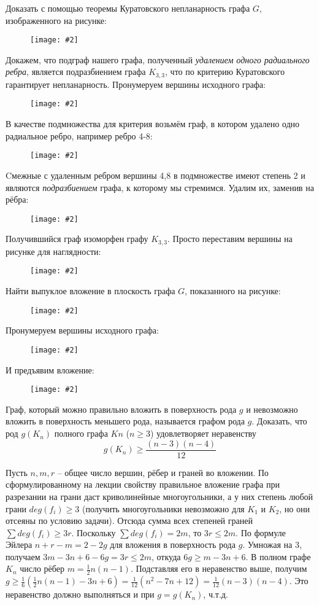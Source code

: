 \documentclass[a4paper,12pt]{article}
\numberwithin{figure}{section}
\newcommand\CenterFigure[2]{\begin{figure}[H]\centering\texttt{[image: \#2]}\end{figure}}
\begin{document}
\begin{problem}
	Доказать с помощью теоремы Куратовского непланарность графа $G$, изображенного на рисунке:
		\CenterFigure{4cm}{kuratovsky-task2-stage0-8angles.png}
\end{problem}
\begin{solution}
	Докажем, что подграф нашего графа, полученный \textit{удалением одного радиального ребра}, является подразбиением графа $K_{3,3}$, что по критерию Куратовского гарантирует непланарность.
	Пронумеруем вершины исходного графа:
		\CenterFigure{6cm}{kuratovsky-task2-stage1.png}
	В качестве подмножества для критерия возьмём граф, в котором удалено одно радиальное ребро, например ребро 4-8:
		\CenterFigure{6cm}{kuratovsky-task2-stage2.png}
	Cмежные с удаленным ребром вершины 4,8 в подмножестве имеют степень 2 и являются \textit{подразбиением} графа, к которому мы стремимся. Удалим их, заменив на рёбра:
		\CenterFigure{6cm}{kuratovsky-task2-stage3.png}
	Получившийся граф изоморфен графу $K_{3,3}$. Просто переставим вершины на рисунке для наглядности:
		\CenterFigure{6cm}{kuratovsky-task2-stage4.png}
\end{solution}



\begin{problem}
	Найти выпуклое вложение в плоскость графа $G$, показанного на рисунке:
		\CenterFigure{4cm}{kuratovsky-task3-stage0.png}
\end{problem}
\begin{solution}
	Пронумеруем вершины исходного графа:
		\CenterFigure{7cm}{kuratovsky-task3-stage1.png}
	И предъявим вложение:
		\CenterFigure{9cm}{kuratovsky-task3-stage2.png}
\end{solution}



\begin{problem}
	Граф, который можно правильно вложить в поверхность рода $g$ и невозможно вложить в поверхность меньшего рода, называется графом рода $g$. Доказать, что род $g(K_n)$ полного графа $Kn$ ($n \ge 3$) удовлетворяет неравенству
	\[ g(K_n) \ge \frac{(n-3)(n-4)}{12} \]
\end{problem}
\begin{solution}
	Пусть $n,m,r$ -- общее число вершин, рёбер и граней во вложении.
	По сформулированному на лекции свойству правильное вложение графа при разрезании на грани даст криволинейные многоугольники, а у них степень любой грани $deg(f_i) \geqslant 3$ (получить многоугольники невозможно для $K_1$ и $K_2$, но они отсеяны по условию задачи).
	Отсюда сумма всех степеней граней $\sum{deg(f_i)} \geqslant 3r$. Поскольку $\sum{deg(f_i)} = 2m$, то $3r \leqslant 2m$.
	По формуле Эйлера $n+r-m = 2-2g$ для вложения в поверхность рода $g$. Умножая на 3, получаем $3m-3n+6-6g=3r \leqslant 2m$, откуда $6g \geqslant m-3n+6$.
	В полном графе $K_n$ число рёбер $m=\frac{1}{2}n(n-1)$. Подставляя его в неравенство выше, получим $g \geqslant \frac{1}{6}\left( \frac{1}{2} n(n-1)-3n+6 \right) = \frac{1}{12}(n^2-7n+12) = \frac{1}{12}(n-3)(n-4)$.
	Это неравенство должно выполняться и при $g=g(K_n)$, ч.т.д.
\end{solution}
\end{document}
